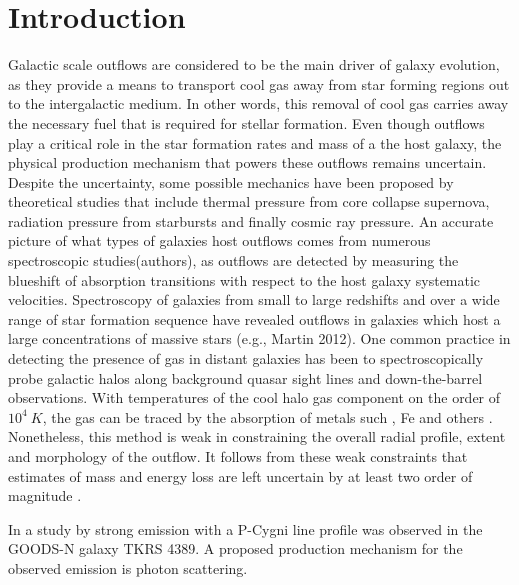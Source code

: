 \documentclass[twocolumn]{aastex6}
\begin{document}
\section{Introduction}
Galactic scale outflows are considered to be the main driver of galaxy evolution, as they provide a means to transport cool gas away from star forming regions out to the intergalactic medium. 
%
%
In other words, this removal of cool gas carries away the necessary fuel that is required for stellar formation. 
%
%
Even though outflows play a critical role in the star formation rates and mass of a the host galaxy\citep{Werk_2014}, the physical production mechanism that powers these outflows remains uncertain.
%
%
Despite the uncertainty, some possible mechanics have been proposed by theoretical studies that include thermal pressure from core collapse supernova, radiation pressure from starbursts and finally cosmic ray pressure\citep{Sugahara_2017,Larson_1974,Chevalier_1985,Springel_2003}. 
%
%
An accurate picture of what types of galaxies host outflows comes from numerous spectroscopic studies(authors), as outflows are detected by measuring the blueshift of absorption transitions with respect to the host galaxy systematic velocities.
%
%
Spectroscopy of galaxies from small to large redshifts and over a wide range of star formation sequence have revealed outflows in galaxies which host a large concentrations of massive stars (e.g., \cite{Rubin_2014} Martin 2012). 
%
One common practice in detecting the presence of gas in distant galaxies has been to spectroscopically probe galactic halos along background quasar sight lines and down-the-barrel observations.
%
With temperatures of the cool halo gas component on the order of $10^4\ K$, the gas can be traced by the absorption of metals such , Fe and others \citep{Bordoloi_2011, Bergeron_1986}. 
%
Nonetheless, this method is weak in constraining the overall radial profile, extent and morphology of the outflow. 
%
It follows from these weak constraints that estimates of mass and energy loss are left uncertain by at least two order of magnitude \citep{Rubin_2011}. 

In a study by \cite{Rubin_2010a} strong  emission with a P-Cygni line profile was observed in the GOODS-N galaxy TKRS 4389. A proposed production mechanism for the observed  emission is photon scattering.
\end{document}
